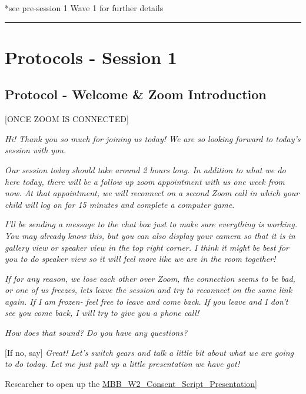 \documentclass[]{book}
\begin{document}
*see pre-session 1 Wave 1 for further details

\begin{center}\rule{0.5\linewidth}{0.5pt}\end{center}

\hypertarget{protocols---session-1-1}{%
\section{Protocols - Session 1}\label{protocols---session-1-1}}

\hypertarget{protocol---welcome-zoom-introduction-1}{%
\subsection{Protocol - Welcome \& Zoom Introduction}\label{protocol---welcome-zoom-introduction-1}}

{[}ONCE ZOOM IS CONNECTED{]}

\emph{Hi! Thank you so much for joining us today! We are so looking forward to today's session with you. }

\emph{Our session today should take around 2 hours long. In addition to what we do here today, there will be a follow up zoom appointment with us one week from now. At that appointment, we will reconnect on a second Zoom call in which your child will log on for 15 minutes and complete a computer game.}

\emph{I'll be sending a message to the chat box just to make sure everything is working. You may already know this, but you can also display your camera so that it is in gallery view or speaker view in the top right corner. I think it might be best for you to do speaker view so it will feel more like we are in the room together!}

\emph{If for any reason, we lose each other over Zoom, the connection seems to be bad, or one of us freezes, lets leave the session and try to reconnect on the same link again. If I am frozen- feel free to leave and come back. If you leave and I don't see you come back, I will try to give you a phone call!}

\emph{How does that sound? Do you have any questions?}

{[}If no, say{]} \emph{Great! Let's switch gears and talk a little bit about what we are going to do today. Let me just pull up a little presentation we have got!}

Researcher to open up the \href{https://ucla.box.com/s/i1kgjgfa81kbc1c79x67h2tfo0fo2x36}{MBB\_W2\_Consent\_Script\_Presentation}{]}
\end{document}
